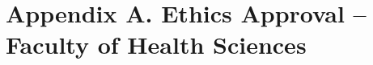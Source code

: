 
\chapter{Appendix A. Ethics Approval -- Faculty of Health Sciences} %
\clearpage
\label{AppendixA} %



%

% 
